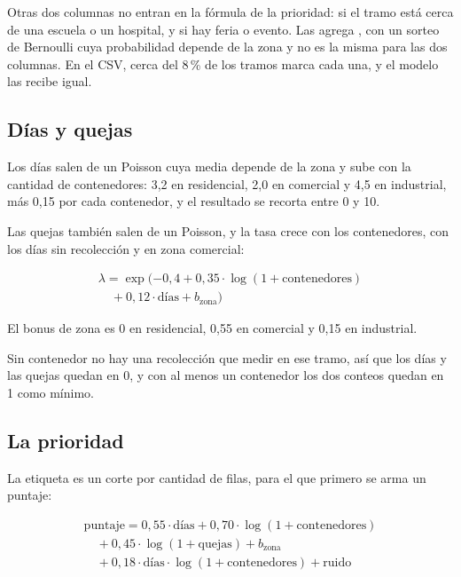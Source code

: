 \documentclass[12pt,a4paper]{report}
\begin{document}
Otras dos columnas no entran en la fórmula de la prioridad: si el tramo está cerca de una escuela o un hospital, y si hay feria o evento. Las agrega , con un sorteo de Bernoulli cuya probabilidad depende de la zona y no es la misma para las dos columnas. En el CSV, cerca del 8\,\% de los tramos marca cada una, y el modelo las recibe igual.

\subsection{Días y quejas}

Los días salen de un Poisson cuya media depende de la zona y sube con la cantidad de contenedores: 3,2 en residencial, 2,0 en comercial y 4,5 en industrial, más 0,15 por cada contenedor, y el resultado se recorta entre 0 y 10.

Las quejas también salen de un Poisson, y la tasa crece con los contenedores, con los días sin recolección y en zona comercial:

\begin{displaymath}
\begin{array}{l}
\lambda = \exp(-0{,}4 + 0{,}35 \cdot \log(1 + \mbox{contenedores}) \\
\quad + 0{,}12 \cdot \mbox{días} + b_{\mbox{zona}})
\end{array}
\end{displaymath}

El bonus de zona es 0 en residencial, 0,55 en comercial y 0,15 en industrial.

Sin contenedor no hay una recolección que medir en ese tramo, así que los días y las quejas quedan en 0, y con al menos un contenedor los dos conteos quedan en 1 como mínimo.

\subsection{La prioridad}

La etiqueta es un corte por cantidad de filas, para el que primero se arma un puntaje:

\begin{displaymath}
\begin{array}{l}
\mbox{puntaje} = 0{,}55 \cdot \mbox{días} + 0{,}70 \cdot \log(1 + \mbox{contenedores}) \\
\quad + 0{,}45 \cdot \log(1 + \mbox{quejas}) + b_{\mbox{zona}} \\
\quad + 0{,}18 \cdot \mbox{días} \cdot \log(1 + \mbox{contenedores}) + \mbox{ruido}
\end{array}
\end{displaymath}
\end{document}
